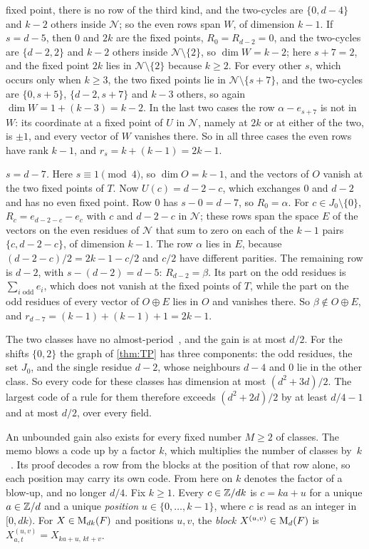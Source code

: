 \begin{informalproof}
\begin{itemize}[leftmargin=1.5em]
fixed point, there is no row of the third kind, and the two-cycles are $\{0,d-4\}$ and $k-2$ others inside
$\mathcal N$; so the even rows span $W$, of dimension $k-1$. If $s=d-5$, then $0$ and $2k$ are the fixed points,
$R_0=R_{d-2}=0$, and the two-cycles are $\{d-2,2\}$ and $k-2$ others inside $\mathcal N\setminus\{2\}$, so
$\dim W=k-2$; here $s+7=2$, and the fixed point $2k$ lies in $\mathcal N\setminus\{2\}$ because $k\ge2$. For every
other $s$, which occurs only when $k\ge3$, the two fixed points lie in $\mathcal N\setminus\{s+7\}$, and the two-cycles
are $\{0,s+5\}$, $\{d-2,s+7\}$ and $k-3$ others, so again $\dim W=1+(k-3)=k-2$. In the last two cases the row
$\alpha-e_{s+7}$ is not in $W$: its coordinate at a fixed point of $U$ in $\mathcal N$, namely at $2k$ or at either of
the two, is $\pm1$, and every vector of $W$ vanishes there. So in all three cases the even rows have rank $k-1$, and
$r_s=k+(k-1)=2k-1$.
\end{itemize}

\emph{$s=d-7$.} Here $s\equiv1\pmod4$, so $\dim O=k-1$, and the vectors of $O$ vanish at the two fixed points of $T$.
Now $U(c)=d-2-c$, which exchanges $0$ and $d-2$ and has no even fixed point. Row $0$ has $s-0=d-7$, so $R_0=\alpha$.
For $c\in J_0\setminus\{0\}$, $R_c=e_{d-2-c}-e_c$ with $c$ and $d-2-c$ in $\mathcal N$; these rows span the space $E$ of
the vectors on the even residues of $\mathcal N$ that sum to zero on each of the $k-1$ pairs $\{c,d-2-c\}$, of
dimension $k-1$. The row $\alpha$ lies in $E$, because $(d-2-c)/2=2k-1-c/2$ and $c/2$ have different parities. The
remaining row is $d-2$, with $s-(d-2)=d-5$: $R_{d-2}=\beta$. Its part on the odd residues is $\sum_{i\text{ odd}}e_i$,
which does not vanish at the fixed points of $T$, while the part on the odd residues of every vector of $O\oplus E$
lies in $O$ and vanishes there. So $\beta\notin O\oplus E$, and $r_{d-7}=(k-1)+(k-1)+1=2k-1$.
\end{informalproof}

The two classes have no almost-period~\cite[Section~4.2]{ClassUniformMemo2026}, and the gain is at most $d/2$. For the
shifts $\{0,2\}$ the graph of \cref{thm:TP} has three components: the odd residues, the set $J_0$, and the single
residue $d-2$, whose neighbours $d-4$ and $0$ lie in the other class. So every code for these classes has dimension at
most $(d^2+3d)/2$. The largest code of a rule for them therefore exceeds $(d^2+2d)/2$ by at least $d/4-1$ and at most
$d/2$, over every field.

An unbounded gain also exists for every fixed number $M\ge2$ of classes. The memo blows a code up by a factor $k$,
which multiplies the
number of classes by~$k$~\cite[Theorem~4.2]{ClassUniformMemo2026}. Its proof decodes a row from the blocks at the
position of that row alone, so each position may carry its own code. From here on $k$ denotes the factor of a
blow-up, and no longer $d/4$. Fix $k\ge1$. Every $c\in\mathbb{Z}/dk$ is $c=ka+u$ for a
unique $a\in\mathbb{Z}/d$ and a unique \emph{position} $u\in\{0,\dots,k-1\}$, where $c$ is read as an integer in $[0,dk)$. For
$X\in\mathrm{M}_{dk}(F)$ and positions $u,v$, the \emph{block} $X^{(u,v)}\in\mathrm{M}_d(F)$ is $X^{(u,v)}_{a,t}=X_{ka+u,\,kt+v}$.

